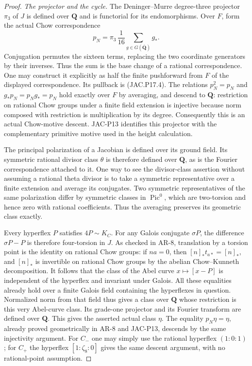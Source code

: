 \begin{proof}
\emph{The projector and the cycle.}
The Deninger--Murre degree-three projector $\pi_3$ of $J$ is
defined over $\mathbf Q$ and is functorial for its endomorphisms.
Over $F$, form the actual Chow correspondence
\[
          p_N=\pi_3\,\frac1{16}\sum_{g\in G(\overline{\mathbf Q})}g_*.
                                                               \tag{JAC.P17.4}
\]
Conjugation permutes the sixteen terms, replacing the two
coordinate generators by their inverses. Thus the sum is the
base change of a rational correspondence. One may construct
it explicitly as half the finite pushforward from $F$ of the
displayed correspondence. Its pullback is (JAC.P17.4).
The relations $p_N^2=p_N$ and $g_*p_N=p_Ng_*=p_N$ hold
exactly over $F$ by averaging, and descend to $\mathbf Q$:
restriction on rational Chow groups under a finite field
extension is injective because norm composed with restriction
is multiplication by its degree. Consequently this is an actual
Chow-motive descent. JAC-P13 identifies this projector with the
complementary primitive motive used in the height calculation.

The principal polarization of a Jacobian is defined over its
ground field. Its symmetric rational divisor class $\theta$ is
therefore defined over $\mathbf Q$, as is the Fourier
correspondence attached to it. One way to see the divisor-class
assertion without assuming a rational theta divisor is to take
a symmetric representative over a finite extension and average
its conjugates. Two symmetric representatives of the same
polarization differ by symmetric classes in $\operatorname{Pic}^0$,
which are two-torsion and hence zero with rational coefficients.
Thus the averaging preserves its geometric class exactly.

Every hyperflex $P$ satisfies $4P\sim K_C$. For any Galois
conjugate $\sigma P$, the difference $\sigma P-P$ is therefore
four-torsion in $J$. As checked in AR-8, translation by a torsion
point is the identity on rational Chow groups: if $na=0$, then
$[n]_*t_{a*}=[n]_*$, and $[n]_*$ is invertible on rational Chow
groups by the abelian Chow--Kunneth decomposition.
It follows that the class of the Abel curve
$x\mapsto[x-P]$ is independent of the hyperflex and invariant
under Galois. All these equalities already hold over a finite
Galois field containing the hyperflexes in question.
Normalized norm from that field thus gives a class over
$\mathbf Q$ whose restriction is this very Abel-curve class.
Its grade-one projector and its Fourier transform are defined
over $\mathbf Q$. This gives the asserted actual class $\eta$.
The equality $p_N\eta=\eta$, already proved geometrically in
AR-8 and JAC-P13, descends by the same injectivity argument.
For $C_-$ one may simply use the rational hyperflex $(1:0:1)$;
for $C_+$ the hyperflex $[1:\zeta_8:0]$ gives the same
descent argument, with no rational-point assumption.


\end{proof}
